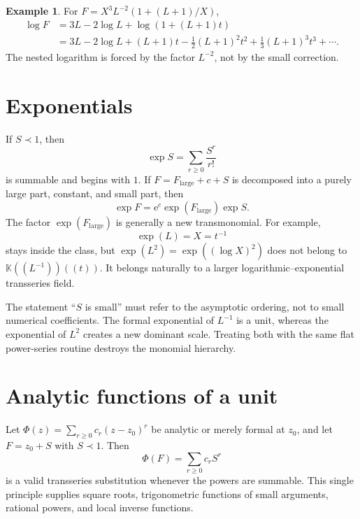 \documentclass[11pt,oneside]{book}
\theoremstyle{definition}
\newtheorem{example}[theorem]{Example}
\theoremstyle{remark}
\newcommand{\K}{\mathbb K}
\newcommand{\e}{\mathrm e}
\newcommand{\precdom}{\prec}
\begin{document}
\begin{example}
For $F=X^3L^{-2}(1+(L+1)/X)$,
\begin{align*}
 \log F
 &=3L-2\log L+\log\left(1+(L+1)t\right)\\
 &=3L-2\log L+(L+1)t-\frac12(L+1)^2t^2
   +\frac13(L+1)^3t^3+\cdots.
\end{align*}
The nested logarithm is forced by the factor $L^{-2}$, not by the small
correction.
\end{example}

\section{Exponentials}
If $S\precdom1$, then
\begin{equation}\label{eq:exp-small}
 \exp S=\sum_{r\ge0}\frac{S^r}{r!}
\end{equation}
is summable and begins with $1$.  If
$F=F_{\mathrm{large}}+c+S$ is decomposed into a purely large part, constant,
and small part, then
\[
 \exp F=\e^c\exp(F_{\mathrm{large}})\exp S.
\]
The factor $\exp(F_{\mathrm{large}})$ is generally a new transmonomial.
For example,
\[
 \exp(L)=X=t^{-1}
\]
stays inside the class, but $\exp(L^2)=\exp((\log X)^2)$ does not belong to
$\K((L^{-1}))((t))$.  It belongs naturally to a larger
logarithmic--exponential transseries field.

\begin{pitfallbox}
The statement ``$S$ is small'' must refer to the asymptotic ordering, not to
small numerical coefficients.  The formal exponential of $L^{-1}$ is a unit,
whereas the exponential of $L^2$ creates a new dominant scale.  Treating both
with the same flat power-series routine destroys the monomial hierarchy.
\end{pitfallbox}

\section{Analytic functions of a unit}
Let $\Phi(z)=\sum_{r\ge0}c_r(z-z_0)^r$ be analytic or merely formal at
$z_0$, and let $F=z_0+S$ with $S\precdom1$.  Then
\begin{equation}\label{eq:analytic-substitution-unit}
 \Phi(F)=\sum_{r\ge0}c_rS^r
\end{equation}
is a valid transseries substitution whenever the powers are summable.  This
single principle supplies square roots, trigonometric functions of small
arguments, rational powers, and local inverse functions.
\end{document}

